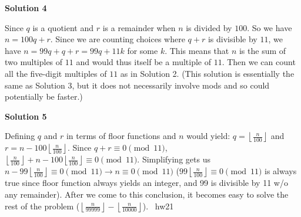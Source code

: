 \begin{enumerate}
\textbf{Solution 4}

Since $q$ is a quotient and $r$ is a remainder when $n$ is divided by $100$. So we have $n=100q+r$. Since we are counting choices where $q+r$ is divisible by $11$, we have $n=99q+q+r=99q+11k$ for some $k$. This means that $n$ is the sum of two multiples of $11$ and would thus itself be a multiple of $11$. Then we can count all the five-digit multiples of $11$ as in Solution 2. (This solution is essentially the same as Solution 3, but it does not necessarily involve mods and so could potentially be faster.)

 



\textbf{Solution 5}

Defining $q$ and $r$ in terms of floor functions and $n$ would yield: $q=\left \lfloor \frac{n}{100} \right \rfloor$ and $r=n-100 \left \lfloor \frac{n}{100} \right \rfloor$. Since $q+r \equiv 0\pmod{11}$, $\left \lfloor \frac{n}{100} \right \rfloor + n-100 \left \lfloor \frac{n}{100} \right \rfloor \equiv 0\pmod{11}$. Simplifying gets us $n-99 \left \lfloor \frac{n}{100} \right \rfloor\equiv 0\pmod{11} \rightarrow n \equiv 0\pmod{11}$ ($99 \left \lfloor \frac{n}{100} \right \rfloor\equiv 0\pmod{11}$ is always true since floor function always yields an integer, and 99 is divisible by 11 w/o any remainder). After we come to this conclusion, it becomes easy to solve the rest of the problem ($\left \lfloor \frac{n}{99999} \right \rfloor - \left \lfloor \frac{n}{10000} \right \rfloor$). ~hw21

 


 


\end{enumerate}